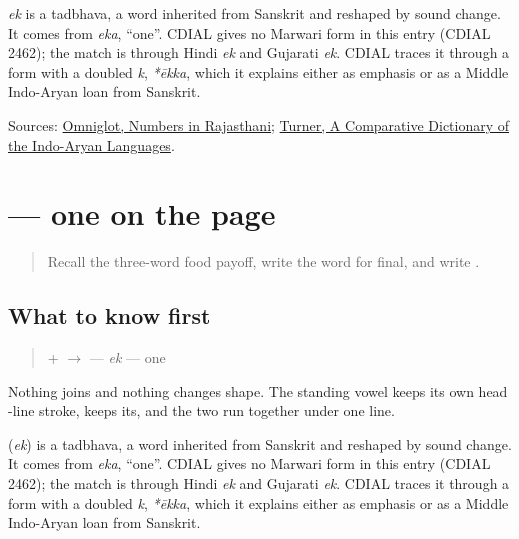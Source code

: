\begin{cousinweb}
\emph{ek} is a tadbhava, a word inherited from Sanskrit and reshaped by sound change. It comes from \emph{eka}, \textquotedblleft{}one\textquotedblright{}. CDIAL gives no Marwari form in this entry (CDIAL 2462); the match is through Hindi \emph{ek} and Gujarati \emph{ek}. CDIAL traces it through a form with a doubled \emph{k}, \emph{*ēkka}, which it explains either as emphasis or as a Middle Indo-Aryan loan from Sanskrit.
\end{cousinweb}

\begin{tcolorbox}[breakable,colback=teal!4,colframe=teal!35!black,title={Before you move on}]
Sources: \href{https://www.omniglot.com/language/numbers/rajasthani.htm}{Omniglot, Numbers in Rajasthani}; \href{https://dsal.uchicago.edu/dictionaries/soas/}{Turner, A Comparative Dictionary of the Indo-Aryan Languages}.
\end{tcolorbox}
\section[\texorpdfstring{\mw{एक} (ek)}{एक (ek)}]{ — one on the page}

\label{lesson:MW-C32-ek}



\begin{quote}
Recall the three-word food payoff, write the word for final, and write \textbf{}.
\end{quote}

\subsection*{What to know first}
\begin{quote}
\textbf{} + \textbf{} $\to$ \textbf{} — \emph{ek} — one
\end{quote}

Nothing joins and nothing changes shape. The standing vowel keeps its own head -line stroke, \textbf{} keeps its, and the two run together under one line.

\begin{cousinweb}
\textbf{} (\emph{ek}) is a tadbhava, a word inherited from Sanskrit and reshaped by sound change. It comes from \emph{eka}, \textquotedblleft{}one\textquotedblright{}. CDIAL gives no Marwari form in this entry (CDIAL 2462); the match is through Hindi \emph{ek} and Gujarati \emph{ek}. CDIAL traces it through a form with a doubled \emph{k}, \emph{*ēkka}, which it explains either as emphasis or as a Middle Indo-Aryan loan from Sanskrit.
\end{cousinweb}

